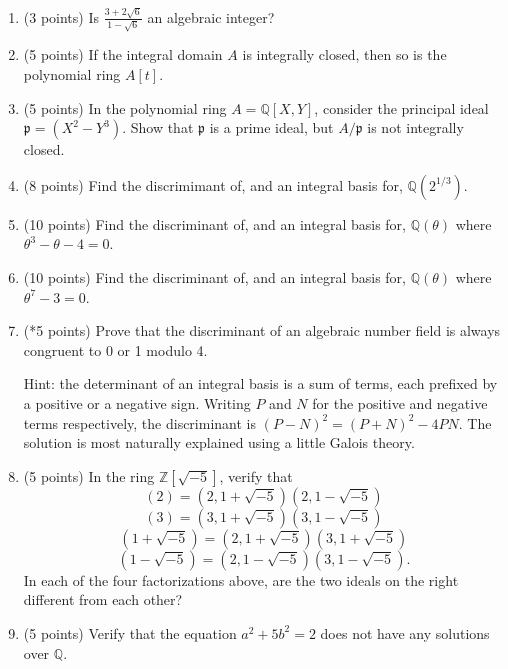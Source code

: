 \documentclass[12pt]{article}
\newcommand{\p}{\mathfrak{p}}
\newcommand{\Q}{\mathbb{Q}}
\newcommand{\Z}{\mathbb{Z}}
\begin{document}
\begin{enumerate}
\item (3 points)
Is $\frac{3 + 2 \sqrt{6}}{1 - \sqrt{6}}$ an algebraic integer?

\item (5 points)
If the integral domain $A$ is integrally closed, then so is the polynomial ring $A[t]$.

\item (5 points)
In the polynomial ring $A = \mathbb{Q}[X, Y]$, consider the principal ideal $\mathfrak{p} = (X^2 - Y^3)$.
Show that $\mathfrak{p}$ is a prime ideal, but $A/\p$ is not integrally closed.

\item (8 points)
Find the discrimimant of, and an integral basis for, $\Q(2^{1/3})$.

\item (10 points)
Find the discriminant of, and an integral basis for, $\Q(\theta)$ where $\theta^3 - \theta - 4 = 0$.

\item (10 points)
Find the discriminant of, and an integral basis for, $\Q(\theta)$ where $\theta^7 - 3 = 0$.

\item (*5 points)
Prove that the discriminant of an algebraic number field is always congruent to 0 or 1 modulo 4.

Hint: the determinant of an integral basis is a sum of terms, each prefixed by a positive or a 
negative sign. Writing $P$ and $N$ for the positive and negative terms respectively, the discriminant
is $(P - N)^2 = (P + N)^2 - 4PN$. The solution is most naturally explained using a little Galois theory.

\item (5 points)
In the ring $\Z[\sqrt{-5}]$, verify that
$$(2) = (2, 1 + \sqrt{-5})(2, 1 - \sqrt{-5})$$
$$(3) = (3, 1 + \sqrt{-5})(3, 1 - \sqrt{-5})$$
$$(1 + \sqrt{-5}) = (2, 1 + \sqrt{-5})(3, 1 + \sqrt{-5})$$
$$(1 - \sqrt{-5}) = (2, 1 - \sqrt{-5})(3, 1 - \sqrt{-5}).$$
In each of the four factorizations above, are the two ideals on the right different from each other?

\item
(5 points) Verify that the equation $a^2 + 5b^2 = 2$ does not have any solutions over $\Q$.

\end{enumerate}
\end{document}

